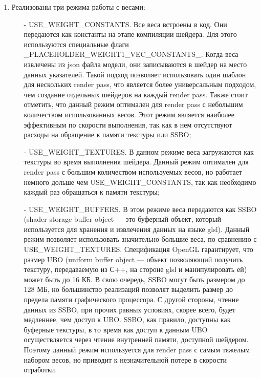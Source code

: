 \documentclass[a4paper,14pt]{extreport}
\begin{document}
\begin{enumerate}
                \item Реализованы три режима работы с весами:
                    \begin{itemize}
                        \item[-] USE\_WEIGHT\_CONSTANTS. Все веса встроены в код. Они передаются как константы на этапе компиляции шейдера. Для этого используются специальные флаги \_PLACEHOLDER\_WEIGHT1\_VEC\_CONSTANTS\_. Когда веса извлечены из json файла модели, они записываются в шейдер на место данных указателей. Такой подход позволяет использовать один шаблон для нескольких render pass, что является более универсальным подходом, чем создание отдельных шейдеров на каждый render pass. Также стоит отметить, что данный режим оптимален для render pass с небольшим количеством использованных весов. Этот режим является наиболее эффективным по скорости выполнения, так как в нем отсутствуют расходы на обращение к памяти текстуры или SSBO;
                        
                        \item[-] USE\_WEIGHT\_TEXTURES. В данном режиме веса загружаются как текстуры во время выполнения шейдера. Данный режим оптимален для render pass с большим количеством используемых весов, но работает немного дольше чем USE\_WEIGHT\_CONSTANTS, так как необходимо каждый раз обращаться к памяти текстуры;
                        
                        \item[-] USE\_WEIGHT\_BUFFERS. В этом режиме веса передаются как SSBO (shader storage buffer object — это буферный объект, который используется для хранения и извлечения данных на языке glsl). Данный режим позволяет использовать значительно большие веса, по сравнению с USE\_WEIGHT\_TEXTURES. Спецификация OpenGL гарантирует, что размер UBO (uniform buffer object — объект позволяющий получить текстуру, передаваемую из С++, на стороне glsl и манипулировать ей) может быть до 16 КБ. В свою очередь, SSBO могут быть размером до 128 МБ, но большинство реализаций позволят выделить размер до предела памяти графического процессора. С другой стороны, чтение данных из SSBO, при прочих равных условиях, скорее всего, будет медленнее, чем доступ к UBO. SSBO, как правило, доступны как буферные текстуры, в то время как доступ к данным UBO осуществляется через чтение внутренней памяти, доступной шейдером. Поэтому данный режим используется для render pass с самым тяжелым набором весов, но приводит к незначительной потере в скорости отработки.

\end{itemize}
\end{enumerate}
\end{document}
